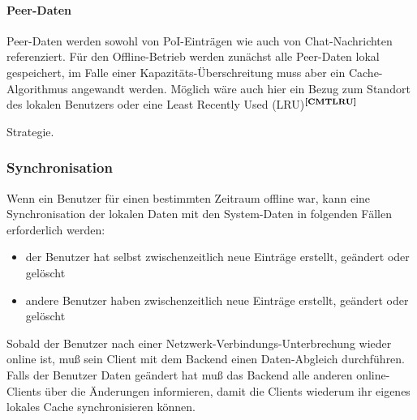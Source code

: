 \paragraph{Peer-Daten}
Peer-Daten werden sowohl von PoI-Einträgen wie auch von Chat-Nachrichten referenziert. Für den Offline-Betrieb werden zunächst alle Peer-Daten lokal gespeichert, im Falle einer Kapazitäts-Überschreitung muss aber ein Cache-Algorithmus angewandt werden. Möglich wäre auch hier ein Bezug zum Standort des lokalen Benutzers oder eine Least Recently Used (LRU)$^{\textbf{\ref{CMTLRU}}}$%
\addtocounter{footnote}{1}%
 Strategie.

\subsubsection{Synchronisation}
Wenn ein Benutzer für einen bestimmten Zeitraum offline war, kann eine Synchronisation
der lokalen Daten mit den System-Daten in folgenden Fällen erforderlich werden:
	\begin{itemize}
		\item der Benutzer hat selbst zwischenzeitlich neue Einträge erstellt, geändert oder gelöscht
		\item andere Benutzer haben zwischenzeitlich neue Einträge erstellt, geändert oder gelöscht
	\end{itemize}
Sobald der Benutzer nach einer Netzwerk-Verbindungs-Unterbrechung wieder online ist, muß sein Client mit dem Backend einen Daten-Abgleich durchführen. Falls der Benutzer Daten geändert hat muß das Backend alle anderen online-Clients über die Änderungen informieren, damit die Clients wiederum ihr eigenes lokales Cache synchronisieren können.

